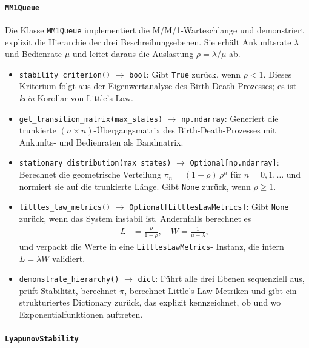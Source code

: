 ﻿\documentclass[a4paper,12pt]{report}
\theoremstyle{definition}
\begin{document}
\paragraph{\texttt{MM1Queue}}

Die Klasse \texttt{MM1Queue} implementiert die M/M/1-Warteschlange
und demonstriert explizit die Hierarchie der drei
Beschreibungsebenen.  Sie erhält Ankunftsrate $\lambda$ und
Bedienrate $\mu$ und leitet daraus die Auslastung $\rho = \lambda/\mu$
ab.

\begin{itemize}
	\item \texttt{stability\_criterion()} $\to$ \texttt{bool}:
	Gibt \texttt{True} zurück, wenn $\rho < 1$.  Dieses
	Kriterium folgt aus der Eigenwertanalyse des
	Birth-Death-Prozesses; es ist \emph{kein} Korollar von
	Little's Law.
	
	\item \texttt{get\_transition\_matrix(max\_states)} $\to$
	\texttt{np.ndarray}:  Generiert die trunkierte
	$(n \times n)$-Übergangsmatrix des Birth-Death-Prozesses mit
	Ankunfts- und Bedienraten als Bandmatrix.
	
	\item \texttt{stationary\_distribution(max\_states)} $\to$
	\texttt{Optional[np.ndarray]}:  Berechnet die geometrische
	Verteilung $\pi_n = (1-\rho)\,\rho^n$ für $n = 0, 1, \ldots$
	und normiert sie auf die trunkierte Länge.  Gibt
	\texttt{None} zurück, wenn $\rho \geq 1$.
	
	\item \texttt{littles\_law\_metrics()} $\to$
	\texttt{Optional[LittlesLawMetrics]}:  Gibt \texttt{None}
	zurück, wenn das System instabil ist.  Andernfalls berechnet
	es
	\begin{align}
		L &= \frac{\rho}{1-\rho}, \quad
		W  = \frac{1}{\mu - \lambda},
	\end{align}
	und verpackt die Werte in eine \texttt{LittlesLawMetrics}-
	Instanz, die intern \mbox{$L = \lambda W$} validiert.
	
	\item \texttt{demonstrate\_hierarchy()} $\to$ \texttt{dict}:
	Führt alle drei Ebenen sequenziell aus, prüft Stabilität,
	berechnet $\pi$, berechnet Little's-Law-Metriken und gibt
	ein strukturiertes Dictionary zurück, das explizit
	kennzeichnet, ob und wo Exponentialfunktionen auftreten.
\end{itemize}

\paragraph{\texttt{LyapunovStability}}
\end{document}
